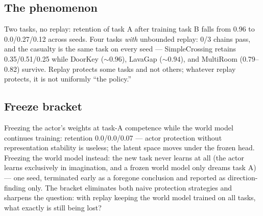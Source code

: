 \documentclass[10pt]{article}
\begin{document}
\subsection{The phenomenon}
Two tasks, no replay: retention of task A after training task B falls from 0.96 to
0.0/0.27/0.12 across seeds. Four tasks \emph{with} unbounded replay: 0/3 chains pass, and
the casualty is the same task on every seed --- SimpleCrossing retains 0.35/0.51/0.25 while
DoorKey (${\sim}0.96$), LavaGap (${\sim}0.94$), and MultiRoom (0.79--0.82) survive. Replay
protects some tasks and not others; whatever replay protects, it is not uniformly ``the
policy.''

\subsection{Freeze bracket}
Freezing the actor's weights at task-A competence while the world model continues training:
retention 0.0/0.0/0.07 --- actor protection without representation stability is useless; the
latent space moves under the frozen head. Freezing the world model instead: the new task
never learns at all (the actor learns exclusively in imagination, and a frozen world model
only dreams task A) --- one seed, terminated early as a foregone conclusion and reported as
direction-finding only. The bracket eliminates both naive protection strategies and sharpens
the question: with replay keeping the world model trained on all tasks, what exactly is
still being lost?
\end{document}
